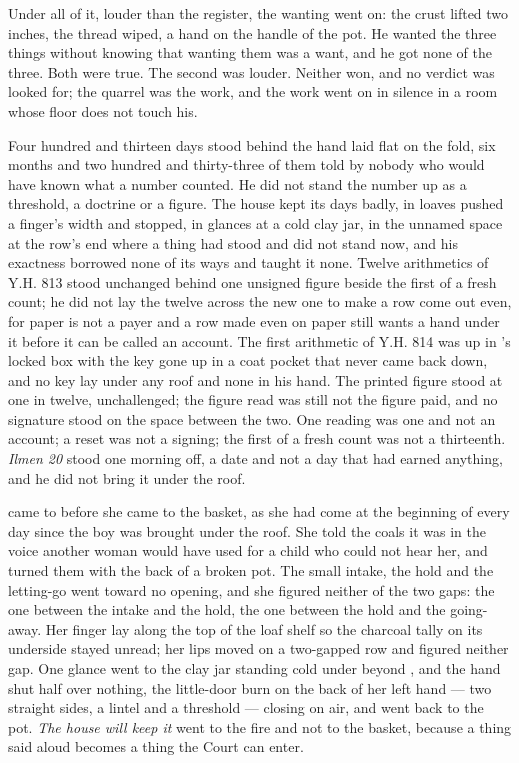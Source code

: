 Under all of it, louder than the register, the wanting went on: the crust lifted two inches, the thread wiped, a hand on the handle of the pot. He wanted the three things without knowing that wanting them was a want, and he got none of the three. Both were true. The second was louder. Neither won, and no verdict was looked for; the quarrel was the work, and the work went on in silence in a room whose floor does not touch his.

Four hundred and thirteen days stood behind the hand laid flat on the fold, six months and two hundred and thirty-three of them told by nobody who would have known what a number counted. He did not stand the number up as a threshold, a doctrine or a figure. The house kept its days badly, in loaves pushed a finger's width and stopped, in glances at a cold clay jar, in the unnamed space at the row's end where a thing had stood and did not stand now, and his exactness borrowed none of its ways and taught it none. Twelve arithmetics of Y.H. 813 stood unchanged behind one unsigned figure beside the first of a fresh count; he did not lay the twelve across the new one to make a row come out even, for paper is not a payer and a row made even on paper still wants a hand under it before it can be called an account. The first arithmetic of Y.H. 814 was up  in 's locked box with the key gone up in a coat pocket that never came back down, and no key lay under any roof and none in his hand. The printed figure stood at one in twelve, unchallenged; the figure read was still not the figure paid, and no signature stood on the space between the two. One reading was one and not an account; a reset was not a signing; the first of a fresh count was not a thirteenth. \emph{Ilmen 20} stood one morning off, a date and not a day that had earned anything, and he did not bring it under the roof.

 came to  before she came to the basket, as she had come at the beginning of every day since the boy was brought under the roof. She told the coals it was  in the voice another woman would have used for a child who could not hear her, and turned them with the back of a broken pot. The small intake, the hold and the letting-go went toward no opening, and she figured neither of the two gaps: the one between the intake and the hold, the one between the hold and the going-away. Her finger lay along the top of the loaf shelf so the charcoal tally on its underside stayed unread; her lips moved on a two-gapped row and figured neither gap. One glance went to the clay jar standing cold under  beyond , and the hand shut half over nothing, the little-door burn on the back of her left hand --- two straight sides, a lintel and a threshold --- closing on air, and went back to the pot. \emph{The house will keep it} went to the fire and not to the basket, because a thing said aloud becomes a thing the Court can enter.

